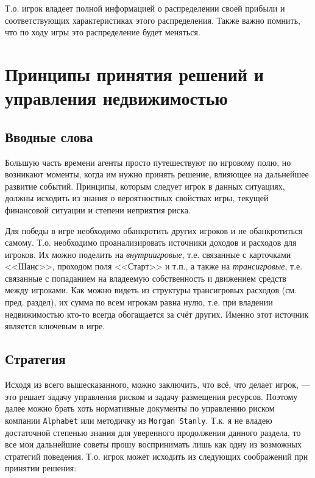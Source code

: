 	Т.о. игрок владеет полной информацией о распределении своей прибыли и соответствующих характеристиках этого распределения. Также важно помнить, что по ходу игры это распределение будет меняться.
	
	\section{Принципы принятия решений и управления недвижимостью}
	
	\subsection*{Вводные слова}
	
	Большую часть времени агенты просто путешествуют по игровому полю, но возникают моменты, когда им нужно принять решение, влияющее на дальнейшее развитие событий. Принципы, которым следует игрок в данных ситуациях, должны исходить из знания о вероятностных свойствах игры, текущей финансовой ситуации и степени неприятия риска.
	
	Для победы в игре необходимо обанкротить других игроков и не обанкротиться самому. Т.о. необходимо проанализировать источники доходов и расходов для игроков. Их можно поделить на \textit{внутриигровые}, т.е. связанные с карточками <<Шанс>>, проходом поля <<Старт>> и т.п., а также на \textit{трансигровые}, т.е. связанные с попаданием на владеемую собственность и движением средств между игроками. Как можно видеть из структуры трансигровых расходов (см. пред. раздел), их сумма по всем игрокам равна нулю, т.е. при владении недвижимостью кто-то всегда обогащается за счёт других. Именно этот источник является ключевым в игре.
	
	\subsection*{Стратегия}
	
	Исходя из всего вышесказанного, можно заключить, что всё, что делает игрок, --- это решает задачу управления риском и задачу размещения ресурсов. Поэтому далее можно брать хоть нормативные документы по управлению риском компании \texttt{Alphabet} или методичку из \texttt{Morgan Stanly}. Т.к. я не владею достаточной степенью знания для уверенного продолжения данного раздела, то все мои дальнейшие советы прошу воспринимать лишь как одну из возможных стратегий поведения. Т.о. игрок может исходить из следующих соображений при принятии решения:
	
